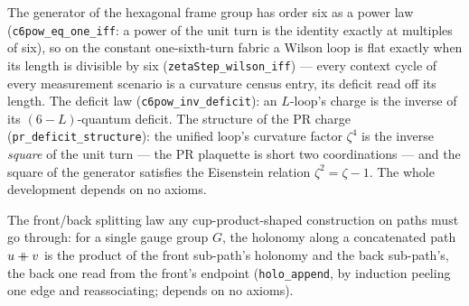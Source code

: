 \begin{theorem}\label{thm:loop-length-dictionary}\leanok{}
The generator of the hexagonal frame group has order six as a power law
(\texttt{c6pow\_eq\_one\_iff}: a power of the unit turn is the identity
exactly at multiples of six), so on the constant one-sixth-turn fabric a
Wilson loop is flat exactly when its length is divisible by six
(\texttt{zetaStep\_wilson\_iff}) --- every context cycle of every
measurement scenario is a curvature census entry, its deficit read off
its length. The deficit law (\texttt{c6pow\_inv\_deficit}): an
$L$-loop's charge is the inverse of its $(6-L)$-quantum deficit. The
structure of the PR charge (\texttt{pr\_deficit\_structure}): the
unified loop's curvature factor $\zeta^4$ is the inverse \emph{square}
of the unit turn --- the PR plaquette is short two coordinations --- and
the square of the generator satisfies the Eisenstein relation
$\zeta^2 = \zeta - 1$. The whole development depends on no axioms.
\end{theorem}

\begin{theorem}\label{thm:holo-append}\leanok{}
The front/back splitting law any cup-product-shaped construction on paths must go through: for a
single gauge group $G$, the holonomy along a concatenated path $u \mathbin{+\kern-0.6em+} v$ is the
product of the front sub-path's holonomy and the back sub-path's, the back one read from the
front's endpoint (\texttt{holo\_append}, by induction peeling one edge and reassociating; depends
on no axioms).
\end{theorem}

